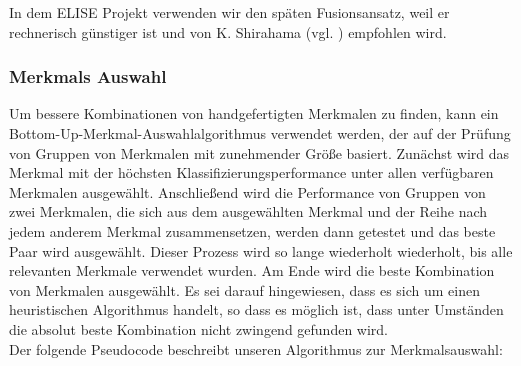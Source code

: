 In dem ELISE Projekt verwenden wir den sp{\"a}ten Fusionsansatz, weil er rechnerisch g{\"u}nstiger ist und von K. Shirahama (vgl. \cite{kimiaki_codebook_approach_2016}) empfohlen wird. \\



\subsubsection{Merkmals Auswahl} \label{featureSelection-1}

Um bessere Kombinationen von handgefertigten Merkmalen zu finden, kann ein Bottom-Up-Merkmal-Auswahlalgorithmus verwendet werden, der auf der Pr{\"u}fung von Gruppen von Merkmalen mit zunehmender Gr{\"o}{\ss}e basiert.
Zun{\"a}chst wird das Merkmal mit der h{\"o}chsten Klassifizierungsperformance unter allen verf{\"u}gbaren Merkmalen ausgew{\"a}hlt. 
Anschlie{\ss}end wird die Performance von Gruppen von zwei Merkmalen, die sich aus dem ausgew{\"a}hlten Merkmal und der Reihe nach jedem anderem Merkmal zusammensetzen, werden dann getestet und das beste Paar wird ausgew{\"a}hlt. 
Dieser Prozess wird so lange wiederholt wiederholt, bis alle relevanten Merkmale verwendet wurden. 
Am Ende wird die beste Kombination von Merkmalen ausgew{\"a}hlt.
Es sei darauf hingewiesen, dass es sich um einen heuristischen Algorithmus handelt, so dass es m{\"o}glich ist, dass unter Umst{\"a}nden die absolut beste Kombination nicht zwingend gefunden wird. \\

Der folgende Pseudocode beschreibt unseren Algorithmus zur Merkmalsauswahl: \\

